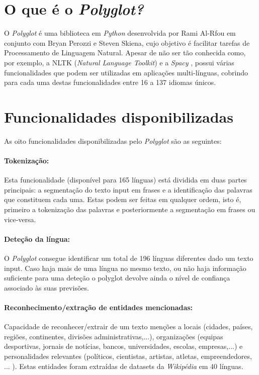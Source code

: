 \documentclass{article}
\begin{document}
\section{O que é o \textit{Polyglot?}}

\quad O \textit{Polyglot} é uma biblioteca em \textit{Python} desenvolvida por Rami Al-Rfou em conjunto com Bryan Perozzi e Steven Skiena, cujo objetivo é facilitar tarefas de Processamento de Linguagem Natural. Apesar de não ser tão conhecida como, por exemplo, a NLTK (\textit{Natural Language Toolkit}) e a \textit{Spacy} \cite{comparacoes}, possui várias funcionalidades que podem ser utilizadas em aplicações multi-línguas, cobrindo para cada uma destas funcionalidades entre 16 a 137 idiomas únicos.


\section{Funcionalidades disponibilizadas}
As oito funcionalidades disponibilizadas pelo \textit{Polyglot} são as seguintes:

\paragraph{Tokenização:} Esta funcionalidade (disponível para 165 línguas) está dividida em duas partes principais: a segmentação do texto input em frases e a identificação das palavras que constituem cada uma. Estas podem ser feitas em qualquer ordem, isto é, primeiro a tokenização das palavras e posteriormente a segmentação em frases ou vice-versa\cite{tokenization}.

\paragraph{Deteção da língua:} O \textit{Polyglot} consegue identificar um total de 196 línguas diferentes dado um texto input. Caso haja mais de uma língua no mesmo texto, ou não haja informação suficiente para uma deteção o polyglot devolve ainda o nível de confiança associado às suas previsões\cite{langdetect}.

\paragraph{Reconhecimento/extração de entidades mencionadas:} Capacidade de reconhecer/extrair de um texto menções a locais (cidades, países, regiões, continentes, divisões administrativas,...), organizações (equipas desportivas, jornais de notícias, bancos, universidades, escolas, empresas,...) e personalidades relevantes (políticos, cientistas, artistas, atletas, empreendedores, ... ). Estas entidades foram extraídas de datasets da \textit{Wikipédia} em 40 línguas\cite{nae}.
\end{document}
